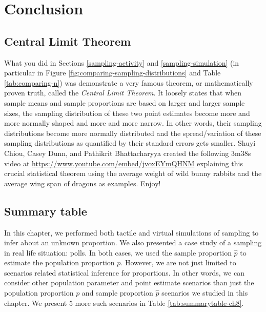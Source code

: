 \documentclass[12pt, krantz2,]{krantz}
\begin{document}
\hypertarget{sampling-conclusion}{%
\section{Conclusion}\label{sampling-conclusion}}

\hypertarget{sampling-conclusion-central-limit-theorem}{%
\subsection{Central Limit Theorem}\label{sampling-conclusion-central-limit-theorem}}

What you did in Sections \ref{sampling-activity} and \ref{sampling-simulation} (in particular in Figure \ref{fig:comparing-sampling-distributions} and Table \ref{tab:comparing-n}) was demonstrate a very famous theorem, or mathematically proven truth, called the \emph{Central Limit Theorem}. It loosely states that when sample means and sample proportions are based on larger and larger sample sizes, the sampling distribution of these two point estimates become more and more normally shaped and more and more narrow. In other words, their sampling distributions become more normally distributed and the spread/variation of these sampling distributions as quantified by their standard errors gets smaller. Shuyi Chiou, Casey Dunn, and Pathikrit Bhattacharyya created the following 3m38s video at \url{https://www.youtube.com/embed/jvoxEYmQHNM} explaining this crucial statistical theorem using the average weight of wild bunny rabbits and the average wing span of dragons as examples. Enjoy!

\hypertarget{sampling-conclusion-table}{%
\subsection{Summary table}\label{sampling-conclusion-table}}

In this chapter, we performed both tactile and virtual simulations of sampling to infer about an unknown proportion. We also presented a case study of a sampling in real life situation: polls. In both cases, we used the sample proportion \(\widehat{p}\) to estimate the population proportion \(p\). However, we are not just limited to scenarios related statistical inference for proportions. In other words, we can consider other population parameter and point estimate scenarios than just the population proportion \(p\) and sample proportion \(\widehat{p}\) scenarios we studied in this chapter. We present 5 more such scenarios in Table \ref{tab:summarytable-ch8}.
\end{document}
